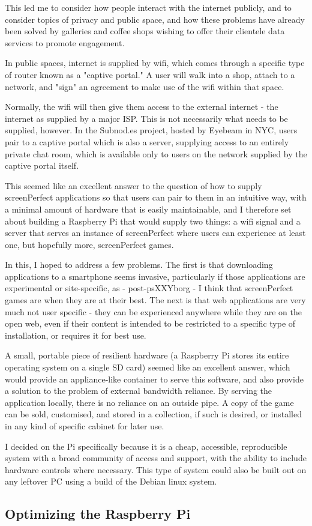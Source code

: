 This led me to consider how people interact with the internet publicly, and to consider topics of privacy and public space, and how these problems have already been solved by galleries and coffee shops wishing to offer their clientele data services to promote engagement.

In public spaces, internet is supplied by wifi, which comes through a specific type of router known as a "captive portal." A user will walk into a shop, attach to a network, and "sign" an agreement to make use of the wifi within that space.

Normally, the wifi will then give them access to the external internet - the internet as supplied by a major ISP. This is not necessarily what needs to be supplied, however. In the Subnod.es project, hosted by Eyebeam in NYC, users pair to a captive portal which is also a server, supplying access to an entirely private chat room, which is available only to users on the network supplied by the captive portal itself.

This seemed like an excellent answer to the question of how to supply screenPerfect applications so that users can pair to them in an intuitive way, with a minimal amount of hardware that is easily maintainable, and I therefore set about building a Raspberry Pi that would supply two things: a wifi signal and a server that serves an instance of screenPerfect where users can experience at least one, but hopefully more, screenPerfect games.

In this, I hoped to address a few problems. The first is that downloading applications to a smartphone seems invasive, particularly if those applications are experimental or site-specific, as - post-psXXYborg - I think that screenPerfect games are when they are at their best. The next is that web applications are very much not user specific - they can be experienced anywhere while they are on the open web, even if their content is intended to be restricted to a specific type of installation, or requires it for best use.

A small, portable piece of resilient hardware (a Raspberry Pi stores its entire operating system on a single SD card) seemed like an excellent answer, which would provide an appliance-like container to serve this software, and also provide a solution to the problem of external bandwidth reliance. By serving the application locally, there is no reliance on an outside pipe. A copy of the game can be sold, customised, and stored in a collection, if such is desired, or installed in any kind of specific cabinet for later use.

I decided on the Pi specifically because it is a cheap, accessible, reproducible system with a broad community of access and support, with the ability to include hardware controls where necessary. This type of system could also be built out on any leftover PC using a build of the Debian linux system.

\subsection{Optimizing the Raspberry Pi}






